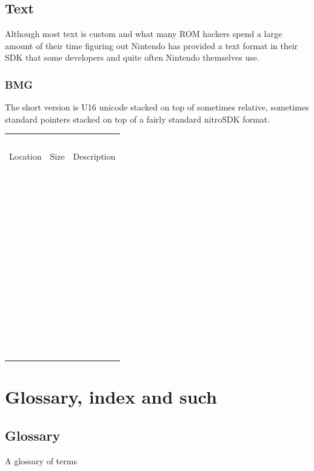 \documentclass[
]{book}
\begin{document}
\hypertarget{text-1}{%
\chapter{Text}\label{text-1}}

Although most text is custom and what many ROM hackers spend a large amount of their time figuring out Nintendo has provided a text format in their SDK that some developers and quite often Nintendo themselves use.

\hypertarget{bmg}{%
\section{BMG}\label{bmg}}

The short version is U16 unicode stacked on top of sometimes relative, sometimes standard pointers stacked on top of a fairly standard nitroSDK format.

\begin{longtable}[]{@{}lll@{}}
\toprule()
\endhead
  &   &   \\
Location & Size & Description \\
  &   &   \\
  &   &   \\
  &   &   \\
  &   &   \\
  &   &   \\
  &   &   \\
  &   &   \\
  &   &   \\
  &   &   \\
  &   &   \\
  &   &   \\
  &   &   \\
  &   &   \\
\bottomrule()
\end{longtable}

\hypertarget{part-glossary-index-and-such}{%
\part{Glossary, index and such}\label{part-glossary-index-and-such}}

\hypertarget{glossary}{%
\chapter{Glossary}\label{glossary}}

A glossary of terms
\end{document}
